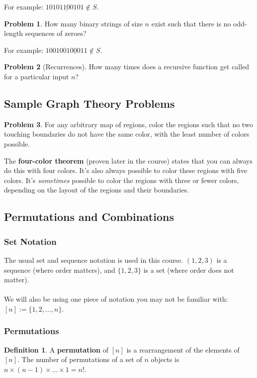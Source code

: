\documentclass[]{article}
\theoremstyle{definition}
\newtheorem{problem}{Problem}[section]
\newtheorem*{defn}{Definition}
\begin{document}
			For example: $1010\underline{1100}101 \not \in S$.
		
			\begin{problem}
				How many binary strings of size $n$ exist such that there is no odd-length sequences of zeroes? 
			\end{problem}
		
			For example: $1001001\underline{000}11 \not \in S$.
		
			\begin{problem}[Recurrences]
				How many times does a recursive function get called for a particular input $n$?
			\end{problem}
		
		\subsection{Sample Graph Theory Problems}
			\begin{problem}
				For any arbitrary map of regions, color the regions such that no two touching boundaries do not have the same color, with the least number of colors possible.
			\end{problem}
		
			The \textbf{four-color theorem} (proven later in the course) states that you can always do this with four colors. It's also always possible to color these regions with five colors. It's \emph{sometimes} possible to color the regions with three or fewer colors, depending on the layout of the regions and their boundaries.
		
		\subsection{Permutations and Combinations}
			\subsubsection{Set Notation}
				The usual set and sequence notation is used in this course. $(1, 2, 3)$ is a sequence (where order matters), and $\{1, 2, 3\}$ is a set (where order does not matter).
				\\ \\
				We will also be using one piece of notation you may not be familiar with: $[n] := \{1, 2, \ldots, n\}$.

			\subsubsection{Permutations}
				\begin{defn}
					A \textbf{permutation} of $[n]$ is a rearrangement of the elements of $[n]$. The number of permutations of a set of $n$ objects is $n \times (n - 1) \times \ldots \times 1 = n!$. 
				\end{defn}
			
\end{document}
